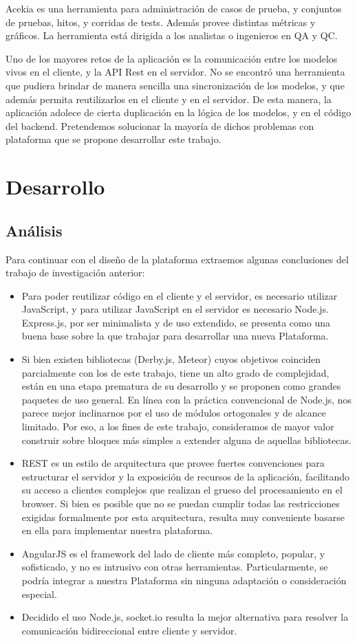 \documentclass[doc,helv,longtable]{article}
\begin{document}
Acekia es una herramienta para administración de casos de prueba, y conjuntos de pruebas, hitos, y corridas de tests. Además provee distintas métricas y gráficos. La herramienta está dirigida a los analistas o ingenieros en QA y QC.

Uno de los mayores retos de la aplicación es la comunicación entre los modelos vivos en el cliente, y la API Rest en el servidor. No se encontró una herramienta que pudiera brindar de manera sencilla una sincronización de los modelos, y que además permita reutilizarlos en el cliente y en el servidor. De esta manera, la aplicación adolece de cierta duplicación en la lógica de los modelos, y en el código del backend. Pretendemos solucionar la mayoría de dichos problemas con plataforma que se propone desarrollar este trabajo. 

\section{Desarrollo}
\subsection{Análisis}
Para continuar con el diseño de la plataforma extraemos algunas conclusiones del trabajo de investigación anterior:
\begin{itemize}
\item  Para poder reutilizar código en el cliente y el servidor, es necesario utilizar JavaScript, y para utilizar JavaScript en el servidor es necesario Node.js. Express.js, por ser minimalista y de uso extendido, se presenta como una buena base sobre la que trabajar para desarrollar una nueva Plataforma.
\item  Si bien existen bibliotecas (Derby.js, Meteor) cuyos objetivos coinciden parcialmente con los de este trabajo, tiene un alto grado de complejidad, están en una etapa prematura de su desarrollo y se proponen como grandes paquetes de uso general. En línea con la práctica convencional de Node.js, nos parece mejor inclinarnos por el uso de módulos ortogonales y de alcance limitado. Por eso, a los fines de este trabajo, consideramos de mayor valor construir sobre bloques más simples a extender alguna de aquellas bibliotecas.
\item  REST es un estilo de arquitectura que provee fuertes convenciones para estructurar el servidor y la exposición de recursos de la aplicación, facilitando su acceso a clientes complejos que realizan el grueso del procesamiento en el browser. Si bien es posible que no se puedan cumplir todas las restricciones exigidas formalmente por esta arquitectura, resulta muy conveniente basarse en ella para implementar nuestra plataforma.
\item  AngularJS es el framework del lado de cliente más completo, popular, y sofisticado, y no es intrusivo con otras herramientas. Particularmente, se podría integrar a nuestra Plataforma sin ninguna adaptación o consideración especial.
\item  Decidido el uso Node.js, socket.io resulta la mejor alternativa para resolver la comunicación bidireccional entre cliente y servidor.

\end{itemize}
\end{document}
